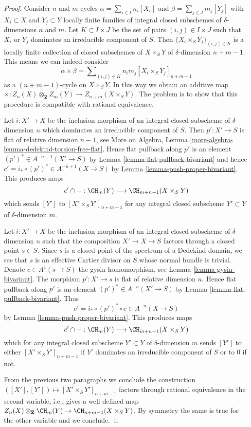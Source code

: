 \begin{proof}
Consider $n$ and $m$ cycles $\alpha = \sum_{i \in I} n_i[X_i]$
and $\beta = \sum_{j \in J} m_j[Y_j]$ with $X_i \subset X$ and $Y_j \subset Y$
locally finite families of integral closed subschemes of
$\delta$-dimensions $n$ and $m$. Let $K \subset I \times J$ be the set
of pairs $(i, j) \in I \times J$ such that $X_i$ or $Y_j$ dominates
an irreducible component of $S$.
Then $\{X_i \times_S Y_j\}_{(i, j) \in K}$ is a locally finite
collection of closed subschemes of $X \times_S Y$ of
$\delta$-dimension $n + m - 1$. This means we can indeed consider
$$
\alpha \times \beta =
\sum\nolimits_{(i, j) \in K} n_i m_j [X_i \times_S Y_j]_{n + m - 1}
$$
as a $(n + m - 1)$-cycle on $X \times_S Y$. In this way we obtain an
additive map
$\times : Z_n(X) \otimes_{\mathbf{Z}} Z_m(Y) \to Z_{n + m}(X \times_S Y)$.
The problem is to show that
this procedure is compatible with rational equivalence.

\medskip\noindent
Let $i : X' \to X$ be the inclusion morphism of an integral closed subscheme
of $\delta$-dimension $n$ which dominates an irreducible component
of $S$. Then $p' : X' \to S$ is flat of relative dimension $n - 1$, see
More on Algebra, Lemma \ref{more-algebra-lemma-dedekind-torsion-free-flat}.
Hence flat pullback along $p'$ is an element
$(p')^* \in A^{-n + 1}(X' \to S)$ by
Lemma \ref{lemma-flat-pullback-bivariant}
and hence $c' = i_* \circ (p')^* \in A^{-n + 1}(X \to S)$ by
Lemma \ref{lemma-push-proper-bivariant}.
This produces maps
$$
c' \cap - : \CH_m(Y) \longrightarrow \CH_{m + n - 1}(X \times_S Y)
$$
which sends $[Y']$ to $[X' \times_S Y']_{n + m - 1}$ for any
integral closed subscheme $Y' \subset Y$ of $\delta$-dimension $m$.

\medskip\noindent
Let $i : X' \to X$ be the inclusion morphism of an integral closed subscheme
of $\delta$-dimension $n$ such that the composition $X' \to X \to S$ 
factors through a closed point $s \in S$. Since $s$ is a closed point
of the spectrum of a Dedekind domain, we see that $s$ is an effective
Cartier divisor on $S$ whose normal bundle is trivial. Denote
$c \in A^1(s \to S)$ the gysin homomorphism, see
Lemma \ref{lemma-gysin-bivariant}. The morphism $p' : X' \to s$
is flat of relative dimension $n$. Hence flat pullback along $p'$
is an element $(p')^* \in A^{-n}(X' \to S)$ by
Lemma \ref{lemma-flat-pullback-bivariant}.
Thus
$$
c' = i_* \circ (p')^* \circ c \in A^{-n}(X \to S)
$$
by Lemma \ref{lemma-push-proper-bivariant}. This produces maps
$$
c' \cap - : \CH_m(Y) \longrightarrow \CH_{m + n - 1}(X \times_S Y)
$$
which for any integral closed subscheme $Y' \subset Y$
of $\delta$-dimension $m$
sends $[Y']$ to either $[X' \times_S Y']_{n + m - 1}$ if $Y'$ dominates
an irreducible component of $S$ or to $0$ if not.

\medskip\noindent
From the previous two paragraphs we conclude
the construction $([X'], [Y']) \mapsto [X' \times_S Y']_{n + m - 1}$
factors through rational equivalence in the second variable, i.e.,
gives a well defined map
$Z_n(X) \otimes_{\mathbf{Z}} \CH_m(Y) \to \CH_{n + m - 1}(X \times_S Y)$.
By symmetry the same is true for the other variable and we conclude.
\end{proof}


